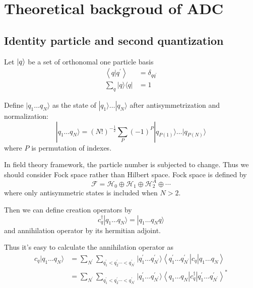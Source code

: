 \section{Theoretical backgroud of ADC}

\subsection{Identity particle and second quantization}
Let $\ket{q}$ be a set of orthonomal one particle basis
\begin{equation}
\begin{aligned}
\left\langle q | q^{\prime}\right\rangle &=\delta_{q q^{\prime}} \\ \sum_{q} | q \rangle\langle q |&=1
\end{aligned}
\end{equation}

Define $| q_{1} \ldots q_{N} \rangle$ as the state of $| q_{1} \rangle \dots | q_{N} \rangle$ after antisymmetrization and normalization:
\begin{equation}
| q_{1} \ldots q_{N} \rangle =(N !)^{-\frac{1}{2}} \sum_{P}(-1)^{P} | q_{P(1)} \rangle \ldots | q_{P(N)} \rangle
\end{equation}
where $P$ is permutation of indexes.

In field theory framework, the particle number is subjected to change.
Thus we should consider Fock space rather than Hilbert space.
Fock space is defined by
\begin{equation}
\mathcal{F}=\mathcal{H}_{0} \oplus \mathcal{H}_{1} \oplus \mathcal{H}_{2}^{A} \oplus \cdots
\end{equation}
where only antisymmetric states is included when $N>2$.

Then we can define creation operators by 
\begin{equation}
c_{q}^{\dagger} | q_{1} \ldots q_{N} \rangle=| q_{1} \ldots q_{N} q \rangle
\end{equation}
and annihilation operator by its hermitian adjoint.

Thus it's easy to calculate the annihilation operator as
\begin{equation}
\begin{aligned}
	c_{q} | q_{1} \ldots q_{N} \rangle&=\sum_{N^{\prime}} \sum_{q_{1}^{\prime}<q_{2}^{\prime} \cdots<q_{N^{\prime}}^{\prime}} | q_{1}^{\prime} \ldots q_{N^{\prime}}^{\prime} \rangle\left\langle q_{1}^{\prime} \ldots q_{N^{\prime}}^{\prime}\left|c_{q}\right| q_{1} \ldots q_{N}\right\rangle
	\\
	&=\sum_{N^{\prime}} \sum_{q_{1}^{\prime}<q_{2}^{\prime} \cdots<q_{N^{\prime}}^{\prime}} | q_{1}^{\prime} \ldots q_{N^{\prime}}^{\prime} \rangle\left\langle q_{1} \ldots q_{N}\left|c_{q}^{\dagger}\right| q_{1}^{\prime} \ldots q_{N^{\prime}}^{\prime}\right\rangle^{*}
\end{aligned}
\end{equation}

